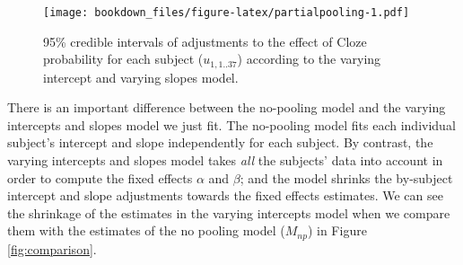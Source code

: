 \documentclass[12pt,]{krantz}
\theoremstyle{definition}
\theoremstyle{definition}
\theoremstyle{definition}
\theoremstyle{remark}
\begin{document}
\begin{figure}
\centering
\texttt{[image: bookdown\_files/figure-latex/partialpooling-1.pdf]}
\caption{\label{fig:partialpooling}95\% credible intervals of adjustments to the effect of Cloze probability for each subject (\(u_{1,1..37}\)) according to the varying intercept and varying slopes model.}
\end{figure}

There is an important difference between the no-pooling model and the varying intercepts and slopes model we just fit. The no-pooling model fits each individual subject's intercept and slope independently for each subject. By contrast, the varying intercepts and slopes model takes \emph{all} the subjects' data into account in order to compute the fixed effects \(\alpha\) and \(\beta\); and the model shrinks the by-subject intercept and slope adjustments towards the fixed effects estimates. We can see the shrinkage of the estimates in the varying intercepts model when we compare them with the estimates of the no pooling model (\(M_{np}\)) in Figure \ref{fig:comparison}.
\end{document}
